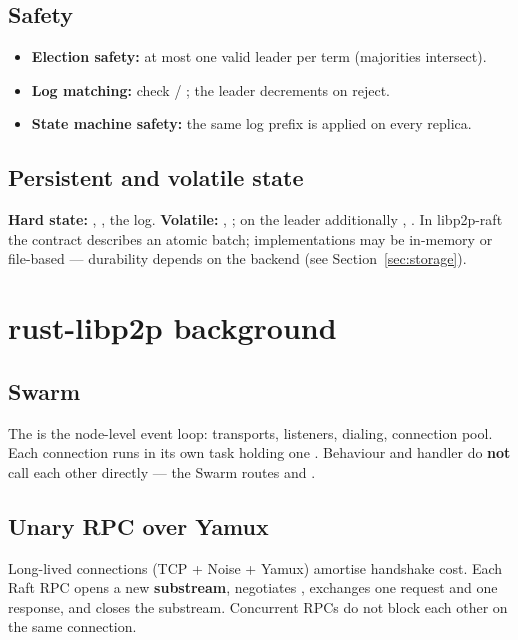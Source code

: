 \subsection{Safety}

\begin{itemize}[nosep]
  \item \textbf{Election safety:} at most one valid leader per term (majorities intersect).
  \item \textbf{Log matching:} check  / ; the leader decrements  on reject.
  \item \textbf{State machine safety:} the same log prefix is applied on every replica.
\end{itemize}

\subsection{Persistent and volatile state}

\textbf{Hard state:} , , the log. \textbf{Volatile:} , ; on the leader additionally , . In libp2p-raft the  contract describes an atomic batch; implementations may be in-memory or file-based --- durability depends on the backend (see Section~\ref{sec:storage}).

\section{rust-libp2p background}

\subsection{Swarm}

The  is the node-level event loop: transports, listeners, dialing, connection pool. Each connection runs in its own task holding one . Behaviour and handler do \textbf{not} call each other directly --- the Swarm routes  and .

\subsection{Unary RPC over Yamux}

Long-lived connections (TCP + Noise + Yamux) amortise handshake cost. Each Raft RPC opens a new \textbf{substream}, negotiates , exchanges one request and one response, and closes the substream. Concurrent RPCs do not block each other on the same connection.

